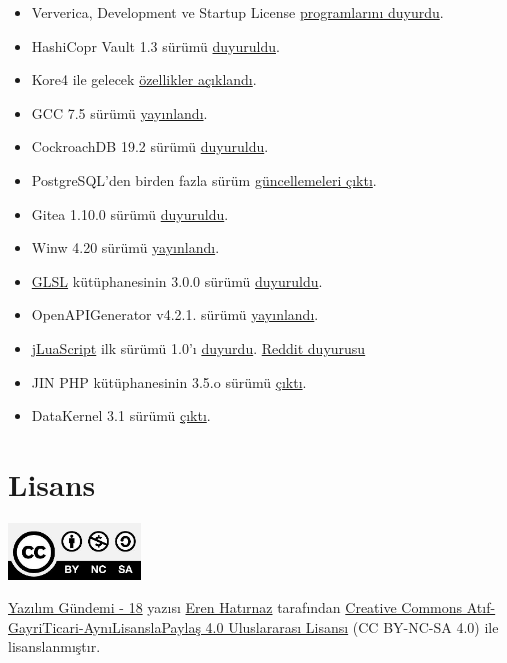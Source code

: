\documentclass[11pt]{article}
\begin{document}
\begin{itemize}
\item Ververica, Development ve Startup License \href{https://www.ververica.com/blog/introducing-the-ververica-developer-and-startup-license-programs}{programlarını duyurdu}.
\item HashiCopr Vault 1.3 sürümü \href{https://www.hashicorp.com/blog/vault-1-3/}{duyuruldu}.
\item Kore4 ile gelecek \href{https://blog.kore.io/posts/kore4-and-python}{özellikler açıklandı}.
\item GCC 7.5 sürümü \href{https://gcc.gnu.org/ml/gcc/2019-11/msg00099.html}{yayınlandı}.
\item CockroachDB 19.2 sürümü \href{https://www.cockroachlabs.com/blog/cockroachdb-19dot2-release/\#}{duyuruldu}.
\item PostgreSQL'den birden fazla sürüm \href{https://www.postgresql.org/about/news/1994/}{güncellemeleri çıktı}.
\item Gitea 1.10.0 sürümü \href{https://blog.gitea.io/2019/11/gitea-1.10.0-is-released/}{duyuruldu}.
\item Winw 4.20 sürümü \href{https://www.winehq.org/news/2019111501}{yayınlandı}.
\item \href{https://crates.io/crates/glsl/3.0.0}{GLSL} kütüphanesinin 3.0.0 sürümü \href{https://github.com/phaazon/glsl/blob/master/glsl/CHANGELOG.md\#30}{duyuruldu}.
\item OpenAPIGenerator v4.2.1. sürümü \href{https://github.com/OpenAPITools/openapi-generator/releases/tag/v4.2.1}{yayınlandı}.
\item \href{https://gitlab.com/RobertZenz/jLuaScript}{jLuaScript} ilk sürümü 1.0'ı \href{https://gitlab.com/RobertZenz/jLuaScript/-/tags/v1.0}{duyurdu}. \href{https://www.reddit.com/r/java/comments/dxdav7/jluascript\_10\_ive\_finally\_finished\_the\_first/f7p3al5/}{Reddit duyurusu}
\item JIN PHP kütüphanesinin 3.5.o sürümü \href{https://github.com/dotink/jin/releases/tag/3.5.0}{çıktı}.
\item DataKernel 3.1 sürümü \href{https://datakernel.io/docs/blog/datakernel-v31-release.html}{çıktı}.
\end{itemize}
\section{Lisans}
\label{sec:orgefc0a27}
\begin{center}
\begin{center}
\includegraphics[height=1.5cm]{../../../img/CC_BY-NC-SA_4.0.png}
\end{center}

\href{yazilim-gundemi-18.pdf}{Yazılım Gündemi - 18} yazısı \href{https://erenhatirnaz.github.io}{Eren Hatırnaz} tarafından \href{http://creativecommons.org/licenses/by-nc-sa/4.0/}{Creative Commons
Atıf-GayriTicari-AynıLisanslaPaylaş 4.0 Uluslararası Lisansı} (CC BY-NC-SA 4.0)
ile lisanslanmıştır.
\end{center}
\end{document}
